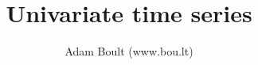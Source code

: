 \documentclass[oneside]{book}
\begin{document}
\author{Adam Boult (www.bou.lt)}
\title{Univariate time series}
\maketitle

\setcounter{tocdepth}{0}
\tableofcontents


\end{document}

